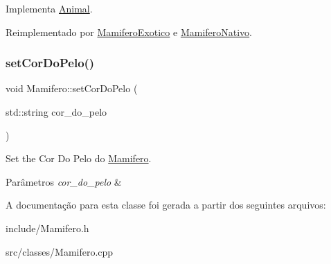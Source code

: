 Implementa \hyperlink{classAnimal_ac75406040726a6339932d70164cc7242}{Animal}.



Reimplementado por \hyperlink{classMamiferoExotico_a4ee6f5f4a2917cfdf54304525add0c4a}{Mamifero\+Exotico} e \hyperlink{classMamiferoNativo_ae2f2b00cb6720cea2780ebef78be52ea}{Mamifero\+Nativo}.

\mbox{\label{classMamifero_af05676a74084b69250490febcff69751}} 
\subsubsection{\texorpdfstring{set\+Cor\+Do\+Pelo()}{setCorDoPelo()}}
{\footnotesize\ttfamily void Mamifero\+::set\+Cor\+Do\+Pelo (\begin{DoxyParamCaption}\item[{std\+::string}]{cor\+\_\+do\+\_\+pelo }\end{DoxyParamCaption})}



Set the Cor Do Pelo do \hyperlink{classMamifero}{Mamifero}. 


\begin{DoxyParams}{Parâmetros}
{\em cor\+\_\+do\+\_\+pelo} & \\
\hline
\end{DoxyParams}


A documentação para esta classe foi gerada a partir dos seguintes arquivos\+:\begin{DoxyCompactItemize}
\item 
include/Mamifero.\+h\item 
src/classes/Mamifero.\+cpp\end{DoxyCompactItemize}
